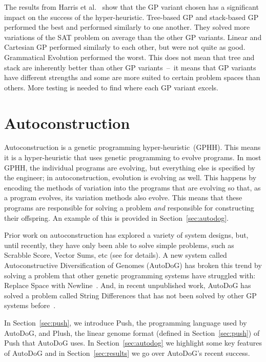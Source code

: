 \documentclass{sig-alternate}
\begin{document}
The results from Harris et al.~\cite{harris:2015} show that the GP variant chosen has a significant impact on the success of the hyper-heuristic. Tree-based GP and stack-based GP performed the best and performed similarly to one another. They solved more variations of the SAT problem on average than the other GP variants. Linear and Cartesian GP performed similarly to each other, but were not quite as good. Grammatical Evolution performed the worst. This does not mean that tree and stack are inherently better than other GP variants~--~it means that GP variants have different strengths and some are more suited to certain problem spaces than others. More testing is needed to find where each GP variant excels.

\section{Autoconstruction}
\label{sec:ac}
Autoconstruction is a genetic programming hyper-heur\-istic~(GPHH). This means it is a hyper-heuristic that uses genetic programming to evolve programs. In most GPHH, the individual programs are evolving, but everything else is specified by the engineer; in autoconstruction, evolution is evolving as well. This happens by encoding the methods of variation into the programs that are evolving so that, as a program evolves, its variation methods also evolve. This means that these programs are responsible for solving a problem \textit{and} responsible for constructing their offspring. An example of this is provided in Section~\ref{sec:autodog}.

Prior work on autoconstruction has explored a variety of system designs, but, until recently, they have only been able to solve simple problems, such as Scrabble Score, Vector Sums, etc (see \cite{helmuth:2015} for details). A new system called Autoconstructive Diversification of Genomes (AutoDoG) has broken this trend by solving a problem that other genetic programming systems have struggled with: Replace Space with Newline~\cite{spector:2016}. And, in recent unpublished work, AutoDoG has solved a problem called String Differences that has not been solved by other GP systems before~\cite{eva:2017}.

In Section~\ref{sec:push}, we introduce Push, the programming language used by AutoDoG, and Plush, the linear genome format (defined in Section~\ref{sec:push}) of Push that AutoDoG uses. In Section~\ref{sec:autodog} we highlight some key features of AutoDoG and in Section~\ref{sec:results} we go over AutoDoG's recent success.
\end{document}
